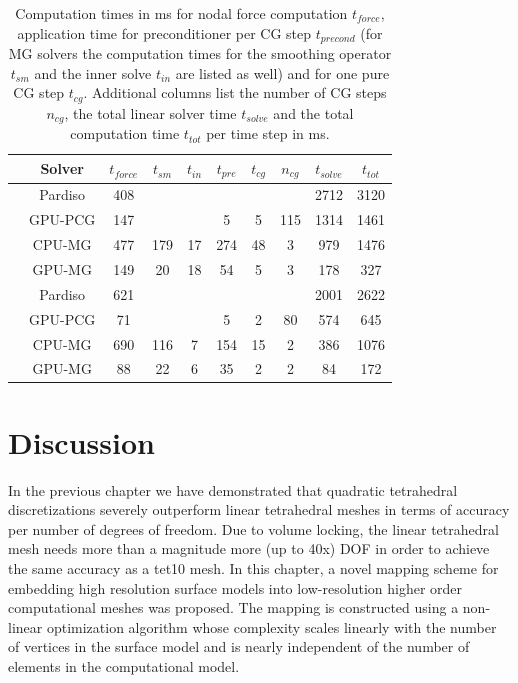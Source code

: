 \begin{table}
	\centering
		\begin{tabular}{cccccccccc}
				\hline & Solver &   $t_{force}$ & $t_{sm}$& $t_{in}$ & $t_{pre}$ & $t_{cg}$ & $n_{cg}$ & $t_{solve}$ & $t_{tot}$ \\\hline 
				 \parbox[t]{0.5mm}{}&Pardiso &  408&  & & & & & 2712& 3120 \\
				& GPU-PCG &  147& & & 5& 5 & 115 & 1314 & 1461\\
				&CPU-MG &  477 & 179 & 17&274&48&3&979&1476 \\
				&GPU-MG &  149 & 20 & 18 &54&5&3& 178&327 \\
				\hline
				 \parbox[t]{0.5mm}{}&Pardiso &  621& & & & & & 2001&2622 \\
				&GPU-PCG &  71& & & 5&2&80&574&645 \\
				&CPU-MG &  690&116&7&154&15&2&386&1076 \\
				&GPU-MG &  88&22&6&35&2&2 &84&172 \\
		\end{tabular}
	\caption{Computation times in ms for nodal force computation $t_{force}$, application time for preconditioner per CG step $t_{precond}$ (for MG solvers the computation times for the smoothing operator $t_{sm}$ and the inner solve $t_{in}$ are listed as well) and for one pure CG step $t_{cg}$. Additional columns list the number of CG steps $n_{cg}$, the total linear solver time $t_{solve}$ and the total computation time $t_{tot}$ per time step in ms.}
	\label{TimingsMGComputations}
\end{table}

\section{Discussion}

In the previous chapter we have demonstrated that quadratic tetrahedral discretizations severely outperform linear tetrahedral meshes in terms of accuracy per number of degrees of freedom. Due to volume locking, the linear tetrahedral mesh needs more than a magnitude more (up to 40x) DOF in order to achieve the same accuracy as a tet10 mesh. In this chapter, a novel mapping scheme for embedding high resolution surface models into low-resolution higher order computational meshes was proposed. The mapping is constructed using a non-linear optimization algorithm whose complexity scales linearly with the number of vertices in the surface model and is nearly independent of the number of elements in the computational model.

